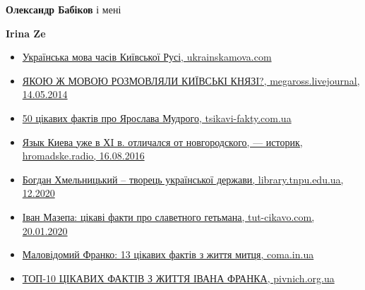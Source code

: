 \begin{itemize}
\begin{itemize}
\textbf{Олександр Бабіков} і мені

 
\textbf{Irina Ze}

\begin{itemize}
\item \href{https://ukrainskamova.com/publ/zagalni_dani/istorija_ukrajinskoji_movi/ukrajinska_mova_chasiv_kijivskoji_rusi/3-1-0-6}{%
Українська мова часів Київської Русі, ukrainskamova.com%
}

\item \href{https://megaross.livejournal.com/15232.html}{%
ЯКОЮ Ж МОВОЮ РОЗМОВЛЯЛИ КИЇВСЬКІ КНЯЗІ?, megaross.livejournal, 14.05.2014%
}

\item \href{https://tsikavi-fakty.com.ua/50-tsikavyh-faktiv-pro-yaroslava-mudrogo}{%
50 цікавих фактів про Ярослава Мудрого, tsikavi-fakty.com.ua%
}

\item \href{https://hromadske.radio/podcasts/kyiv-donbas/yazyk-kyeva-uzhe-v-hi-v-otlychalsya-ot-novgorodskogo-ystoryk}{%
Язык Киева уже в ХI в. отличался от новгородского, — историк, hromadske.radio, 16.08.2016%
}

\item \href{http://www.library.tnpu.edu.ua/index.php/en/virtual-exhibitions/3670-xmelnyckyj-bogdan}{%
Богдан Хмельницький – творець української держави, library.tnpu.edu.ua, 12.2020%
}

\item \href{https://tut-cikavo.com/pro-ukrainu/vydatni-liudy/950-ivan-mazepa}{%
Іван Мазепа: цікаві факти про славетного гетьмана, tut-cikavo.com, 20.01.2020%
}

\item \href{https://coma.in.ua/26828}{%
Маловідомий Франко: 13 цікавих фактів з життя митця, coma.in.ua%
}

\item \href{http://pivnich.org.ua/997-top-10-ckavih-faktv-z-zhittya-vana-franka.html}{%
ТОП-10 ЦІКАВИХ ФАКТІВ З ЖИТТЯ ІВАНА ФРАНКА, pivnich.org.ua%
}

\end{itemize}

\end{itemize}


\end{itemize}
